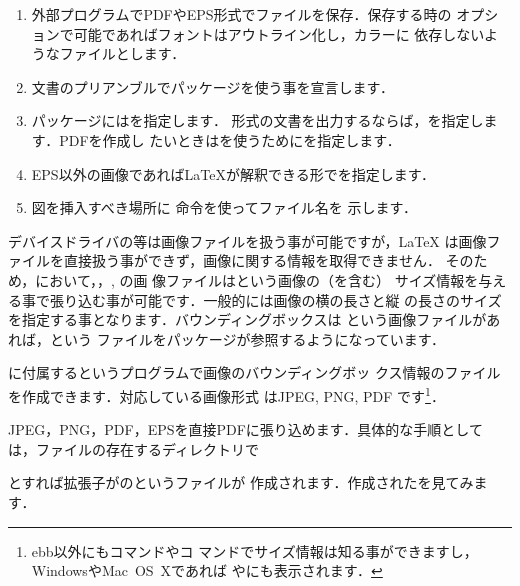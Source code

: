 \begin{enumerate}
%
%
\item 外部プログラムでPDFやEPS形式でファイルを保存．保存する時の
      オプションで可能であればフォントはアウトライン化し，カラーに
      依存しないようなファイルとします．
\item 文書のプリアンブルでパッケージを使う事を宣言します．
\item {}パッケージにはを指定します．
      \PS 形式の文書を出力するならば，を指定します．PDFを作成し
      たいときは\prog{\Dvipdfmx}を使うためにを指定します．
\item EPS以外の画像であれば\LaTeX が解釈できる形でを指定します．
\item  図を挿入すべき場所に 命令を使ってファイル名を
      示します．
\end{enumerate}

デバイスドライバの\Dvipdfmx 等は画像ファイルを扱う事が可能ですが，\LaTeX
は画像ファイルを直接扱う事ができず，画像に関する情報を取得できません．
そのため，\Dvipdfmx において，，, の画
像ファイルはという画像の（を含む）
%
サイズ情報を与える事で張り込む事が可能です．一般的には画像の横の長さと縦
の長さのサイズを指定する事となります．バウンディングボックスは
という画像ファイルがあれば，という
ファイルをパッケージが参照するようになっています．

\Dvipdfm に付属するというプログラムで画像のバウンディングボッ
クス情報のファイル を作成できます．対応している画像形式
はJPEG, PNG, PDF です\footnote{ebb以外にもコマンドやコ%
マンドでサイズ情報は知る事ができますし，WindowsやMac~OS~Xであれば%
やにも表示されます．}．

JPEG，PNG，PDF，EPSを直接PDFに張り込めます．具体的な手順として
は，ファイルの存在するディレクトリで
\begin{InTerm}
\end{InTerm}
とすれば拡張子がのというファイルが
作成されます．作成されたを見てみます．

\begin{InText}
\end{InText}

